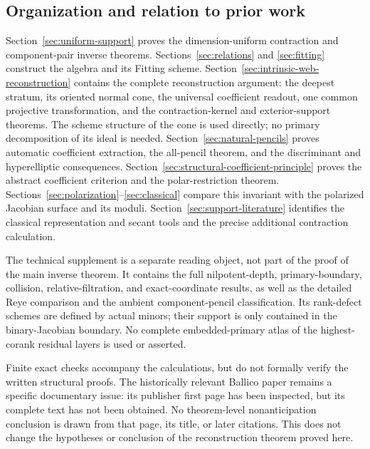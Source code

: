 \subsection{Organization and relation to prior work}

Section~\ref{sec:uniform-support} proves the dimension-uniform
contraction and component-pair inverse theorems.
Sections~\ref{sec:relations} and \ref{sec:fitting} construct the algebra
and its Fitting scheme.  Section~\ref{sec:intrinsic-web-reconstruction}
contains the complete reconstruction argument: the deepest stratum,
its oriented normal cone, the universal coefficient readout, one
common projective transformation, and the contraction-kernel and
exterior-support theorems.  The scheme structure of the cone is
used directly; no primary decomposition of its ideal is needed.
Section~\ref{sec:natural-pencils} proves automatic coefficient extraction,
the all-pencil theorem, and the discriminant and hyperelliptic
consequences.  Section~\ref{sec:structural-coefficient-principle} proves the abstract
coefficient criterion and the polar-restriction theorem.
Sections~\ref{sec:polarization}--\ref{sec:classical} compare this
invariant with the polarized Jacobian surface and its moduli.
Section~\ref{sec:support-literature} identifies the classical
representation and secant tools and the precise additional
contraction calculation.

The technical supplement is a separate reading object, not part of
the proof of the main inverse theorem.  It contains the full
nilpotent-depth, primary-boundary, collision, relative-filtration,
and exact-coordinate results, as well as the detailed Reye comparison
and the ambient component-pencil classification.  Its rank-defect
schemes are defined by actual minors; their support is only contained
in the binary-Jacobian boundary.  No complete embedded-primary atlas
of the highest-corank residual layers is used or asserted.

Finite exact checks accompany the calculations, but do not formally
verify the written structural proofs.  The historically relevant
Ballico paper \cite{Ballico93} remains a specific documentary issue:
its publisher first page has been inspected, but its complete text
has not been obtained.  No theorem-level nonanticipation conclusion
is drawn from that page, its title, or later citations.
This does not change the hypotheses or conclusion of the reconstruction
theorem proved here.
